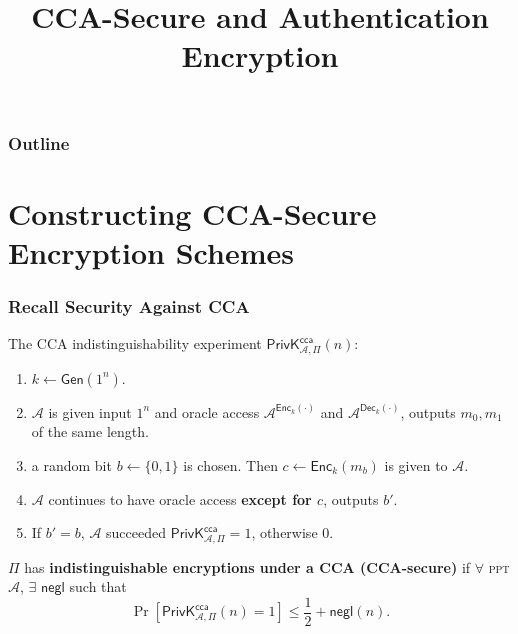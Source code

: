 

\title{CCA-Secure and Authentication Encryption}


\maketitle
\begin{frame}
\frametitle{Outline}
\tableofcontents
\end{frame}
\section{Constructing CCA-Secure Encryption Schemes}
\begin{frame}\frametitle{Recall Security Against CCA}
The CCA indistinguishability experiment $\mathsf{PrivK}^{\mathsf{cca}}_{\mathcal{A},\Pi}(n)$:
\begin{enumerate}
	\item $k \gets \mathsf{Gen}(1^n)$.
	\item $\mathcal{A}$ is given input $1^n$ and oracle access $\mathcal{A}^{\mathsf{Enc}_k(\cdot)}$ and $\mathcal{A}^{\mathsf{Dec}_k(\cdot)}$, outputs $m_0, m_1$ of the same length.
	\item a random bit $b \gets \{0,1\}$ is chosen. Then $c \gets \mathsf{Enc}_k(m_b)$ is given to $\mathcal{A}$.
	\item $\mathcal{A}$ continues to have oracle access \textbf{except for $c$}, outputs $b'$.
	\item If $b' = b$, $\mathcal{A}$ succeeded $\mathsf{PrivK}^{\mathsf{cca}}_{\mathcal{A},\Pi}=1$, otherwise 0.
\end{enumerate}
\begin{definition}
$\Pi$ has \textbf{indistinguishable encryptions under a CCA (CCA-secure)} if $\forall$ \textsc{ppt} $\mathcal{A}$, $\exists$ $\mathsf{negl}$ such that
\[ \Pr\left[\mathsf{PrivK}^{\mathsf{cca}}_{\mathcal{A},\Pi}(n)=1\right] \le \frac{1}{2} + \mathsf{negl}(n).
\]
\end{definition}
\end{frame}
